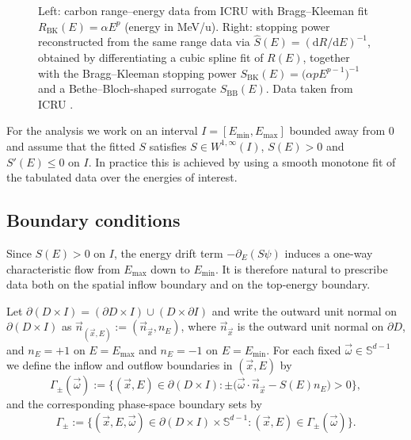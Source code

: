 \documentclass[final]{amsart}
\begin{document}
\begin{figure}[h!]
\begin{subfigure}{.49\linewidth}
  \end{subfigure}

  \caption{Left: carbon range--energy data from ICRU with
    Bragg--Kleeman fit $R_{\mathrm{BK}}(E)=\alpha E^p$ (energy in
    MeV/u). Right: stopping power reconstructed from the same range
    data via $\widehat S(E)=(\mathrm dR/\mathrm dE)^{-1}$, obtained by
    differentiating a cubic spline fit of $R(E)$, together with the
    Bragg--Kleeman stopping power $S_{\mathrm{BK}}(E)=\big(\alpha p
    E^{p-1}\big)^{-1}$ and a Bethe--Bloch-shaped surrogate
    $S_{\mathrm{BB}}(E)$. Data taken from ICRU
    \cite{icru2005report73}.}
  \label{fig:carbon_stopping}
\end{figure}

For the analysis we work on an interval $I=[E_{\min},E_{\max}]$ bounded
away from $0$ and assume that the fitted $S$ satisfies
$S\in W^{1,\infty}(I)$, $S(E)>0$ and $S'(E)\le 0$ on $I$. In practice
this is achieved by using a smooth monotone fit of the tabulated data
over the energies of interest.

\subsection{Boundary conditions}

Since $S(E)>0$ on $I$, the energy drift term $-\partial_E(S\psi)$ induces
a one-way characteristic flow from $E_{\max}$ down to $E_{\min}$. It is
therefore natural to prescribe data both on the spatial inflow boundary
and on the top-energy boundary.

Let $\partial(D\times I)=(\partial D\times I)\cup(D\times\partial I)$ and
write the outward unit normal on $\partial(D\times I)$ as
$\vec n_{(\vec x,E)}:=(\vec n_{\vec x},n_E)$, where $\vec n_{\vec x}$ is
the outward unit normal on $\partial D$, and $n_E=+1$ on $E=E_{\max}$ and
$n_E=-1$ on $E=E_{\min}$. For each fixed $\vec\omega\in\mathbb S^{d-1}$ we
define the inflow and outflow boundaries in $(\vec x,E)$ by
\[
  \Gamma_\pm(\vec\omega)
  :=
  \Big\{(\vec x,E)\in\partial(D\times I) : 
  \pm\big(\vec\omega\cdot\vec n_{\vec x}-S(E) n_E\big)>0\Big\},
\]
and the corresponding phase-space boundary sets by
\[
  \Gamma_\pm
  :=
  \big\{(\vec x,E,\vec\omega)\in \partial(D\times I)\times\mathbb S^{d-1} : 
  (\vec x,E)\in \Gamma_\pm(\vec\omega)\big\}.
\]
\end{document}
